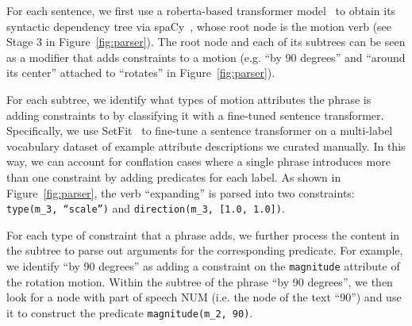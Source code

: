 For each sentence, we first use a roberta-based transformer model~\cite{liu2019roberta}  to
obtain its syntactic dependency tree via
spaCy~\cite{honnibal2020spacy}, whose root node is the motion verb
(see Stage 3 in Figure~\ref{fig:parser}).
The root node and each of
its subtrees can be seen as a modifier that adds constraints to a
motion (e.g. ``by 90 degrees'' and ``around its center'' attached to
``rotates'' in Figure~\ref{fig:parser}). 

For each subtree, we identify what types of motion attributes the phrase is adding constraints to by classifying it with a fine-tuned sentence transformer. 
Specifically, we use SetFit~\cite{tunstall2022setfit} to fine-tune a sentence transformer on a multi-label vocabulary dataset of example attribute descriptions we curated manually. 
In this way, we can account for conflation cases where a single phrase
introduces more than one constraint by adding predicates for each
label.  As shown in Figure~\ref{fig:parser}, the verb ``expanding'' is
parsed into two constraints: \texttt{type(m\_3, ``scale'')} and
\texttt{direction(m\_3, [1.0, 1.0])}.

%
%

For each type of constraint that a phrase adds, we further process the content in the subtree to parse out arguments for the corresponding predicate.
For example, we identify ``by 90 degrees'' as adding a constraint on the \texttt{magnitude} attribute of the rotation motion.
Within the subtree of the phrase ``by 90 degrees'', we then look for a node with part of speech NUM (i.e. the node of the text ``90'') and use it to construct the predicate \texttt{magnitude(m\_2, 90)}.


